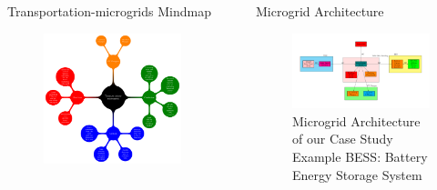 \documentclass[final, 20 pt]{beamer}
\newlength{\sepwid}
\newlength{\onecolwid}
\begin{document}
\begin{frame}[t]
\begin{columns}[t]
\begin{column}{\onecolwid}
\begin{block}{Transportation-microgrids Mindmap}	
	\begin{figure}
		\centering
		\includegraphics[width=0.7\linewidth]{Fig/paper_mindmap}
		\caption{}
		\label{fig:papermindmap}
	\end{figure}	
\end{block}

\end{column} %

\begin{column}{\sepwid}\end{column} %

\begin{column}{\onecolwid} %


\begin{block}{Microgrid Architecture}
	\begin{figure}[!htb] 		
		\includegraphics[width=\linewidth]{Fig/power_system_setup_modelica}
		\caption{\footnotesize Microgrid Architecture of our Case Study Example BESS: Battery Energy Storage System}
		\label{fig:powersystemsetupfull}
	\end{figure}
\end{block}



\end{column}
\end{columns}
\end{frame}
\end{document}
